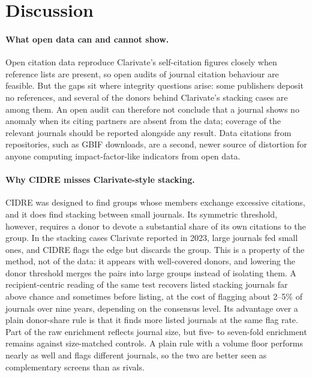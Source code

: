 \section{Discussion}\label{sec:discussion}

\paragraph{What open data can and cannot show.}
Open citation data reproduce Clarivate's self-citation figures closely when reference lists are present, so open
audits of journal citation behaviour are feasible. But the gaps sit where integrity questions arise: some publishers
deposit no references, and several of the donors behind Clarivate's stacking cases are among them. An open audit can
therefore not conclude that a journal shows no anomaly when its citing partners are absent from the data; coverage
of the relevant journals should be reported alongside any result. Data citations from repositories, such as GBIF
downloads, are a second, newer source of distortion for anyone computing impact-factor-like indicators from open
data.

\paragraph{Why CIDRE misses Clarivate-style stacking.}
CIDRE was designed to find groups whose members exchange excessive citations, and it does find stacking between small
journals. Its symmetric threshold, however, requires a donor to devote a substantial share of its own citations to the
group. In the stacking cases Clarivate reported in 2023, large journals fed small ones, and CIDRE flags the edge but
discards the group. This is a property of the method, not of the data: it appears with well-covered donors, and
lowering the donor threshold merges the pairs into large groups instead of isolating them. A recipient-centric reading
of the same test recovers listed stacking journals far above chance and sometimes before listing, at the cost of
flagging about 2--5\% of journals over nine years, depending on the consensus level. Its advantage over a plain
donor-share rule is that it finds more listed journals at the same flag rate. Part of the raw enrichment reflects
journal size, but five- to seven-fold enrichment remains against size-matched controls. A plain rule with a volume floor
performs nearly as well and flags different journals, so the two are better seen as complementary screens than as
rivals.

